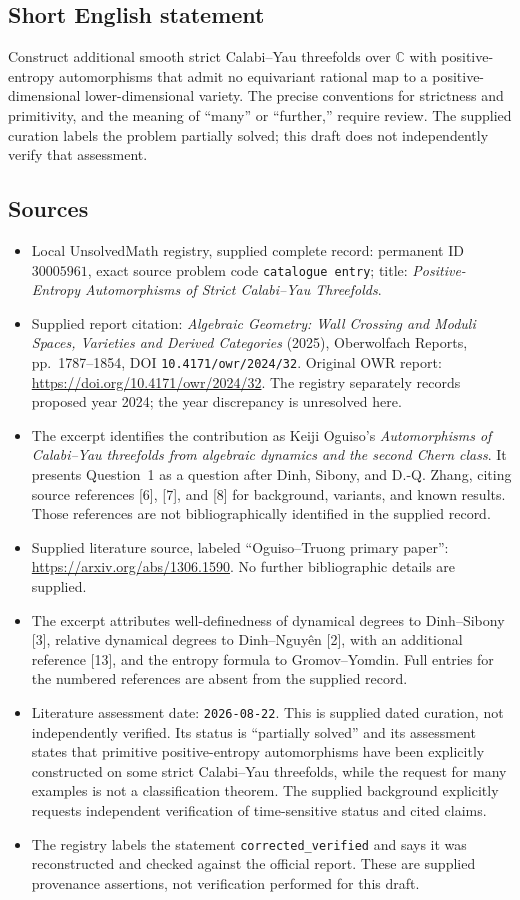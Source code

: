 \documentclass[11pt]{article}
\newcommand{\C}{\mathbb{C}}
\begin{document}
\subsection{Short English statement}
Construct additional smooth strict Calabi--Yau threefolds over \(\C\) with positive-entropy automorphisms that admit no equivariant rational map to a positive-dimensional lower-dimensional variety. The precise conventions for strictness and primitivity, and the meaning of ``many'' or ``further,'' require review. The supplied curation labels the problem partially solved; this draft does not independently verify that assessment.
\subsection{Sources}
\begin{itemize}
\item Local UnsolvedMath registry, supplied complete record: permanent ID \(30005961\), exact source problem code \texttt{catalogue entry}; title: \emph{Positive-Entropy Automorphisms of Strict Calabi--Yau Threefolds}.
\item Supplied report citation: \emph{Algebraic Geometry: Wall Crossing and Moduli Spaces, Varieties and Derived Categories} (2025), Oberwolfach Reports, pp.~1787--1854, DOI \texttt{10.4171/owr/2024/32}. Original OWR report: \url{https://doi.org/10.4171/owr/2024/32}. The registry separately records proposed year 2024; the year discrepancy is unresolved here.
\item The excerpt identifies the contribution as Keiji Oguiso's \emph{Automorphisms of Calabi--Yau threefolds from algebraic dynamics and the second Chern class}. It presents Question~1 as a question after Dinh, Sibony, and D.-Q. Zhang, citing source references [6], [7], and [8] for background, variants, and known results. Those references are not bibliographically identified in the supplied record.
\item Supplied literature source, labeled ``Oguiso--Truong primary paper'': \url{https://arxiv.org/abs/1306.1590}. No further bibliographic details are supplied.
\item The excerpt attributes well-definedness of dynamical degrees to Dinh--Sibony [3], relative dynamical degrees to Dinh--Nguy\^en [2], with an additional reference [13], and the entropy formula to Gromov--Yomdin. Full entries for the numbered references are absent from the supplied record.
\item Literature assessment date: \texttt{2026-08-22}. This is supplied dated curation, not independently verified. Its status is ``partially solved'' and its assessment states that primitive positive-entropy automorphisms have been explicitly constructed on some strict Calabi--Yau threefolds, while the request for many examples is not a classification theorem. The supplied background explicitly requests independent verification of time-sensitive status and cited claims.
\item The registry labels the statement \texttt{corrected\_verified} and says it was reconstructed and checked against the official report. These are supplied provenance assertions, not verification performed for this draft.
\end{itemize}
\end{document}

